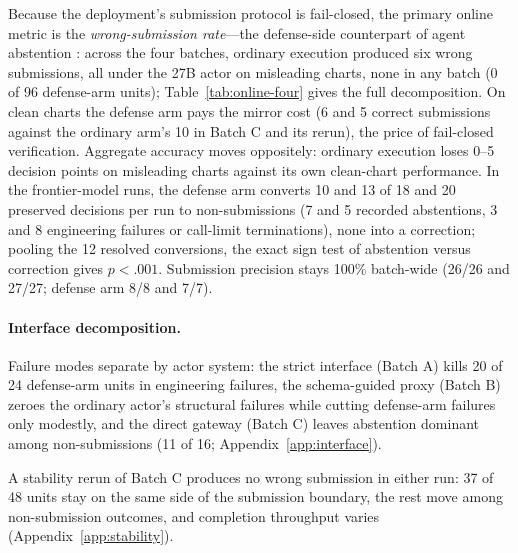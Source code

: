 Because the deployment's submission protocol is
fail-closed, the primary online metric is the
\emph{wrong-submission rate}---the defense-side
counterpart of agent abstention
\citep{liu2026agentabstain, luo2026agentic}: across
the four batches,
ordinary execution produced six wrong submissions, all
under the 27B actor on misleading charts, \ours{}
none in any batch (0 of 96
defense-arm units); Table~\ref{tab:online-four} gives the full decomposition. On clean charts the defense arm pays the mirror cost (6 and 5 correct submissions against the ordinary arm's 10 in Batch C and its rerun), the price of fail-closed verification.
Aggregate accuracy moves oppositely: ordinary execution
loses 0--5 decision points on misleading charts
against its own clean-chart performance.
In the frontier-model runs, the defense arm converts 10
and 13 of 18 and 20 preserved decisions per run to
non-submissions (7 and 5 recorded abstentions, 3
and 8 engineering failures or call-limit
terminations), none into a correction; pooling the 12
resolved conversions, the exact sign test of
abstention versus correction gives $p<.001$.
Submission precision stays 100\% batch-wide (26/26 and
27/27; defense arm 8/8 and 7/7).


\paragraph{Interface decomposition.}
Failure modes separate by actor system: the strict interface
(Batch A) kills 20 of 24 defense-arm units in
engineering failures, the schema-guided proxy (Batch B) zeroes the ordinary actor's structural failures while cutting defense-arm failures
only modestly, and the direct gateway (Batch
C) leaves abstention dominant among non-submissions
(11 of 16; Appendix~\ref{app:interface}).

A stability rerun of Batch C produces no wrong submission in either run: 37 of 48 units stay on the same side of the submission boundary, the rest move among non-submission outcomes, and completion throughput varies (Appendix~\ref{app:stability}).
